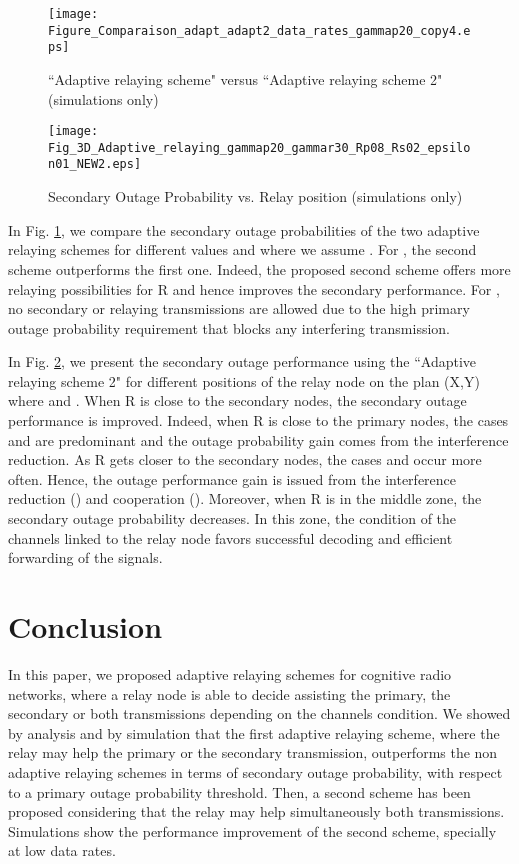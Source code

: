 \documentclass[conference,twocolumn]{IEEEtran}
\begin{document}
\begin{figure}
\centering
  \texttt{[image: Figure\_Comparaison\_adapt\_adapt2\_data\_rates\_gammap20\_copy4.eps]}
  \caption{``Adaptive relaying scheme" versus ``Adaptive relaying scheme 2" (simulations only)}
  \label{Fig:compare_adapt12}
\end{figure}
\begin{figure}
\centering
  \texttt{[image: Fig\_3D\_Adaptive\_relaying\_gammap20\_gammar30\_Rp08\_Rs02\_epsilon01\_NEW2.eps]}
  \caption{Secondary Outage Probability vs. Relay position (simulations only)}
  \label{Fig:3D}
\end{figure}

In Fig. \ref{Fig:compare_adapt12}, we compare the secondary outage probabilities of the two adaptive relaying schemes for different  values and where we assume . For , the second scheme outperforms the first one. Indeed, the proposed second scheme offers more relaying possibilities for R and hence improves the secondary performance. For , no secondary or relaying transmissions are allowed due to the high primary outage probability requirement that blocks any interfering transmission.


In Fig. \ref{Fig:3D}, we present the secondary outage performance using the
``Adaptive relaying scheme 2" for different positions of the relay
node on the plan (X,Y) where  and . When R is close to the secondary nodes, the secondary outage performance is improved. Indeed, when R is close to the primary nodes, the cases  and  are predominant and the outage probability gain comes from the interference reduction. As R gets closer to the secondary nodes, the cases  and  occur more often. Hence, the outage performance gain is issued from the interference reduction () and cooperation (). Moreover, when R is in the middle zone, the secondary outage probability decreases. In this zone, the condition of the channels linked to the relay node favors successful decoding and efficient forwarding of the signals.


\section{Conclusion}
In this paper, we proposed adaptive relaying schemes for cognitive radio networks, where a relay node is able to decide assisting the primary, the secondary or both transmissions depending on the channels condition. We showed by analysis and by simulation that the first adaptive relaying scheme, where the relay may help the primary or the secondary transmission, outperforms the non adaptive relaying schemes in terms of secondary outage probability, with respect to a primary outage probability threshold. Then, a second scheme has been proposed considering that the relay may help simultaneously both transmissions. Simulations show the performance improvement of the second scheme, specially at low data rates.
\end{document}
